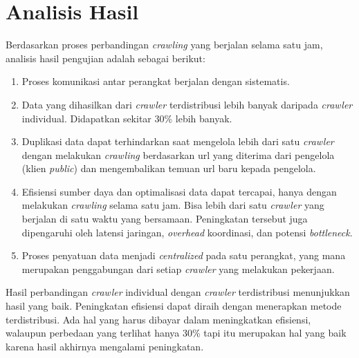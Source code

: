 \section{Analisis Hasil}
Berdasarkan proses perbandingan \emph{crawling} yang berjalan selama satu jam, analisis hasil pengujian adalah sebagai berikut:

\begin{enumerate}
	\item Proses komunikasi antar perangkat berjalan dengan sistematis.

	\item Data yang dihasilkan dari \emph{crawler} terdistribusi lebih banyak daripada \emph{crawler} individual. Didapatkan sekitar 30\% lebih banyak.
	
	\item Duplikasi data dapat terhindarkan saat mengelola lebih dari satu \emph{crawler} dengan melakukan \emph{crawling} berdasarkan url yang diterima dari pengelola (klien \emph{public}) dan mengembalikan temuan url baru kepada pengelola.

	\item Efisiensi sumber daya dan optimalisasi data dapat tercapai, hanya dengan melakukan \emph{crawling} selama satu jam. Bisa lebih dari satu \emph{crawler} yang berjalan di satu waktu yang bersamaan. Peningkatan tersebut juga dipengaruhi oleh latensi jaringan, \emph{overhead} koordinasi, dan potensi \emph{bottleneck}.

	\item Proses penyatuan data menjadi \emph{centralized} pada satu perangkat, yang mana merupakan penggabungan dari setiap \emph{crawler} yang melakukan pekerjaan.
\end{enumerate}

Hasil perbandingan \emph{crawler} individual dengan \emph{crawler} terdistribusi menunjukkan hasil yang baik. Peningkatan efisiensi dapat diraih dengan menerapkan metode terdistribusi. Ada hal yang harus dibayar dalam meningkatkan efisiensi, walaupun perbedaan yang terlihat hanya 30\% tapi itu merupakan hal yang baik karena hasil akhirnya mengalami peningkatan. 

